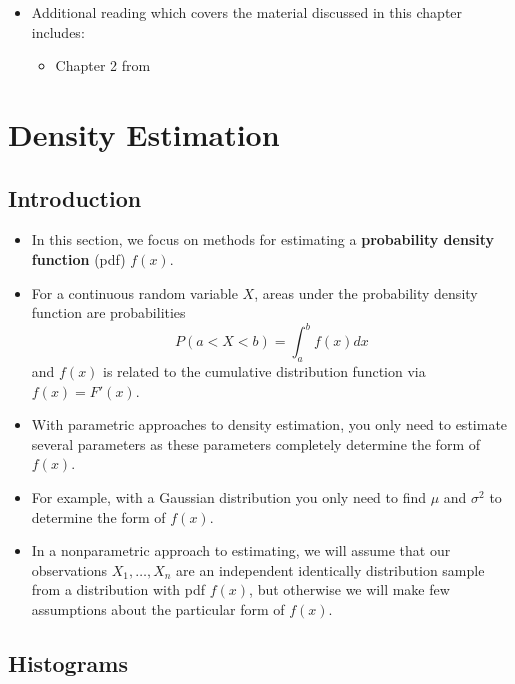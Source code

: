 \documentclass[]{book}
\providecommand{\tightlist}{%
  \setlength{\itemsep}{0pt}\setlength{\parskip}{0pt}}
\begin{document}
\begin{itemize}
\tightlist
\item
  Additional reading which covers the material discussed in this chapter includes:

  \begin{itemize}
  \tightlist
  \item
    Chapter 2 from \citet{wasserman2006}
  \end{itemize}
\end{itemize}

\hypertarget{density-estimation}{%
\chapter{Density Estimation}\label{density-estimation}}

\hypertarget{introduction}{%
\section{Introduction}\label{introduction}}

\begin{itemize}
\item
  In this section, we focus on methods for estimating a \textbf{probability density function} (pdf) \(f(x)\).
\item
  For a continuous random variable \(X\), areas under the probability density function are probabilities
  \begin{equation}
  P(a < X < b) = \int_{a}^{b} f(x) dx \nonumber
  \end{equation}
  and \(f(x)\) is related to the cumulative distribution function via \(f(x) = F'(x)\).
\item
  With parametric approaches to density estimation, you only need to estimate several parameters as
  these parameters completely determine the form of \(f(x)\).
\item
  For example, with a Gaussian distribution you only need to find \(\mu\) and \(\sigma^{2}\) to
  determine the form of \(f(x)\).
\item
  In a nonparametric approach to estimating, we will assume that our observations \(X_{1}, \ldots, X_{n}\)
  are an independent identically distribution sample from a distribution with pdf \(f(x)\), but otherwise we will
  make few assumptions about the particular form of \(f(x)\).
\end{itemize}

\hypertarget{histograms}{%
\section{Histograms}\label{histograms}}
\end{document}
